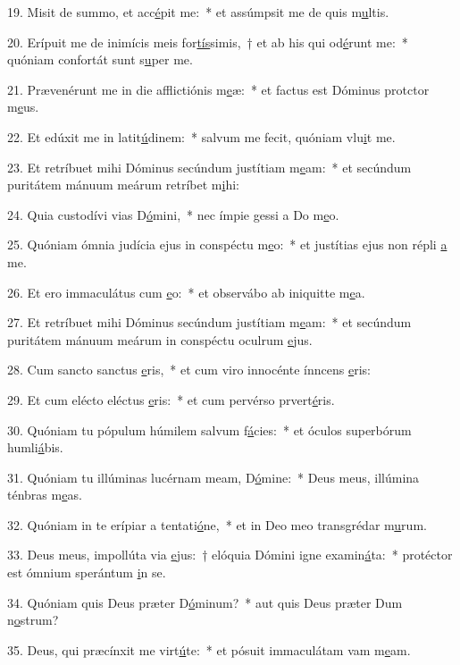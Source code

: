 19. Misit de summo, et acc\uline{é}pit me:~* et assúmpsit me de quis m\uline{u}ltis.\par 
20. Erípuit me de inimícis meis for\uline{tís}simis,~† et ab his qui od\uline{é}runt me:~* quóniam confortát sunt s\uline{u}per me.\par 
21. Prævenérunt me in die afflictiónis m\uline{e}æ:~* et factus est Dóminus protctor m\uline{e}us.\par 
22. Et edúxit me in latit\uline{ú}dinem:~* salvum me fecit, quóniam vlu\uline{i}t me.\par 
23. Et retríbuet mihi Dóminus secúndum justítiam m\uline{e}am:~* et secúndum puritátem mánuum meárum retríbet m\uline{i}hi:\par 
24. Quia custodívi vias D\uline{ó}mini,~* nec ímpie gessi a Do m\uline{e}o.\par 
25. Quóniam ómnia judícia ejus in conspéctu m\uline{e}o:~* et justítias ejus non répli \uline{a} me.\par 
26. Et ero immaculátus cum \uline{e}o:~* et observábo ab iniquitte m\uline{e}a.\par 
27. Et retríbuet mihi Dóminus secúndum justítiam m\uline{e}am:~* et secúndum puritátem mánuum meárum in conspéctu oculrum \uline{e}jus.\par 
28. Cum sancto sanctus \uline{e}ris,~* et cum viro innocénte ínncens \uline{e}ris:\par 
29. Et cum elécto eléctus \uline{e}ris:~* et cum pervérso prvert\uline{é}ris.\par 
30. Quóniam tu pópulum húmilem salvum f\uline{á}cies:~* et óculos superbórum humli\uline{á}bis.\par 
31. Quóniam tu illúminas lucérnam meam, D\uline{ó}mine:~* Deus meus, illúmina ténbras m\uline{e}as.\par 
32. Quóniam in te erípiar a tentati\uline{ó}ne,~* et in Deo meo transgrédar m\uline{u}rum.\par 
33. Deus meus, impollúta via \uline{e}jus:~† elóquia Dómini igne examin\uline{á}ta:~* protéctor est ómnium sperántum \uline{i}n se.\par 
34. Quóniam quis Deus præter D\uline{ó}minum?~* aut quis Deus præter Dum n\uline{o}strum?\par 
35. Deus, qui præcínxit me virt\uline{ú}te:~* et pósuit immaculátam vam m\uline{e}am.\par 

